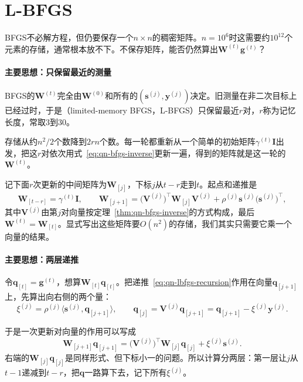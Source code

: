 \section{L-BFGS}
\label{sec:qn-lbfgs}

BFGS不必解方程，但仍要保存一个$n\times n$的稠密矩阵。$n=10^6$时这需要约$10^{12}$个元素的存储，通常根本放不下。不保存矩阵，能否仍然算出$\bm{W}^{(t)}\bm{g}^{(t)}$？

\paragraph{主要思想：只保留最近的测量}
BFGS的$\bm{W}^{(t)}$完全由$\bm{W}^{(0)}$和所有的$(\bm{s}^{(j)},\bm{y}^{(j)})$决定。旧测量在非二次目标上已经过时，于是（limited-memory BFGS，L-BFGS）只保留最近$r$对，$r$称为记忆长度，常取$3$到$30$。

存储从约$n^2/2$个数降到$2rn$个数。每一轮都重新从一个简单的初始矩阵$\gamma^{(t)}\bm{I}$出发，把这$r$对依次用式~\eqref{eq:qn-bfgs-inverse}更新一遍，得到的矩阵就是这一轮的$\bm{W}^{(t)}$。

记下面$r$次更新的中间矩阵为$\bm{W}_{[j]}$，下标$j$从$t-r$走到$t$。起点和递推是
\begin{equation}
 \bm{W}_{[t-r]}=\gamma^{(t)}\bm{I},\qquad
 \bm{W}_{[j+1]}=\bigl(\bm{V}^{(j)}\bigr)^\top\bm{W}_{[j]}\bm{V}^{(j)}+\rho^{(j)}\bm{s}^{(j)}\bigl(\bm{s}^{(j)}\bigr)^\top,
 \label{eq:qn-lbfgs-recursion}
\end{equation}
其中$\bm{V}^{(j)}$由第$j$对向量按定理~\ref{thm:qn-bfgs-inverse}的方式构成，最后$\bm{W}^{(t)}=\bm{W}_{[t]}$。显式写出这些矩阵要$O(n^2)$的存储，我们其实只需要它乘一个向量的结果。

\paragraph{主要思想：两层递推}
令$\bm{q}_{[t]}=\bm{g}^{(t)}$，想算$\bm{W}_{[t]}\bm{q}_{[t]}$。把递推~\eqref{eq:qn-lbfgs-recursion}作用在向量$\bm{q}_{[j+1]}$上，先算出向右侧的两个量：
\[
 \xi^{(j)}=\rho^{(j)}\langle\bm{s}^{(j)},\bm{q}_{[j+1]}\rangle,\qquad
 \bm{q}_{[j]}=\bm{V}^{(j)}\bm{q}_{[j+1]}=\bm{q}_{[j+1]}-\xi^{(j)}\bm{y}^{(j)}.
\]

于是一次更新对向量的作用可以写成
\[
 \bm{W}_{[j+1]}\bm{q}_{[j+1]}=\bigl(\bm{V}^{(j)}\bigr)^\top\bm{W}_{[j]}\bm{q}_{[j]}+\xi^{(j)}\bm{s}^{(j)}.
\]
右端的$\bm{W}_{[j]}\bm{q}_{[j]}$是同样形式、但下标小一的问题。所以计算分两层：第一层让$j$从$t-1$递减到$t-r$，把$\bm{q}$一路算下去，记下所有$\xi^{(j)}$。

